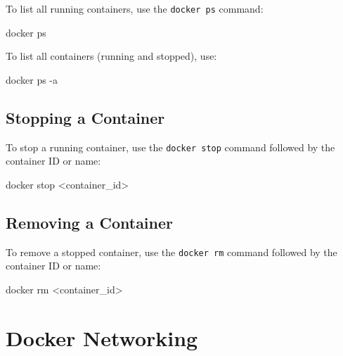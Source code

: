 \documentclass[
  letterpaper,
  DIV=11,
  numbers=noendperiod]{scrreprt}
\newenvironment{Shaded}{\begin{snugshade}}{\end{snugshade}}
\newcommand{\AttributeTok}[1]{\textcolor[rgb]{0.40,0.45,0.13}{#1}}
\newcommand{\ExtensionTok}[1]{\textcolor[rgb]{0.00,0.23,0.31}{#1}}
\newcommand{\NormalTok}[1]{\textcolor[rgb]{0.00,0.23,0.31}{#1}}
\newcommand{\OperatorTok}[1]{\textcolor[rgb]{0.37,0.37,0.37}{#1}}
\begin{document}
To list all running containers, use the \texttt{docker\ ps} command:

\begin{Shaded}
\begin{Highlighting}[]
\ExtensionTok{docker}\NormalTok{ ps}
\end{Highlighting}
\end{Shaded}

To list all containers (running and stopped), use:

\begin{Shaded}
\begin{Highlighting}[]
\ExtensionTok{docker}\NormalTok{ ps }\AttributeTok{{-}a}
\end{Highlighting}
\end{Shaded}

\subsection{Stopping a Container}\label{stopping-a-container}

To stop a running container, use the \texttt{docker\ stop} command
followed by the container ID or name:

\begin{Shaded}
\begin{Highlighting}[]
\ExtensionTok{docker}\NormalTok{ stop }\OperatorTok{\textless{}}\NormalTok{container\_id}\OperatorTok{\textgreater{}}
\end{Highlighting}
\end{Shaded}

\subsection{Removing a Container}\label{removing-a-container}

To remove a stopped container, use the \texttt{docker\ rm} command
followed by the container ID or name:

\begin{Shaded}
\begin{Highlighting}[]
\ExtensionTok{docker}\NormalTok{ rm }\OperatorTok{\textless{}}\NormalTok{container\_id}\OperatorTok{\textgreater{}}
\end{Highlighting}
\end{Shaded}

\section{Docker Networking}\label{docker-networking}
\end{document}
